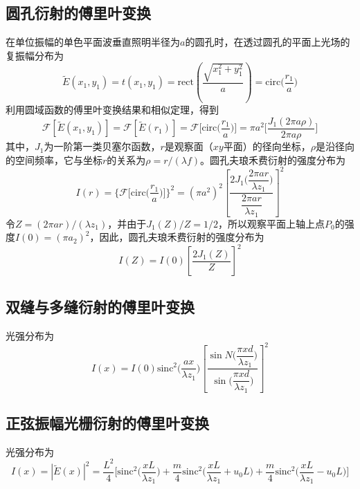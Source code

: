\documentclass[cn,10pt,chinesefont=founder,math=mtpro2,cite=super,toc=onecol,twoside]{elegantbook}
\begin{document}
\subsection{圆孔衍射的傅里叶变换}

在单位振幅的单色平面波垂直照明半径为$a$的圆孔时，在透过圆孔的平面上光场的复振幅分布为
\begin{equation}
\tilde{E}(x_1,y_1)=t(x_1,y_1)=\mathrm{rect}\left(\frac{\sqrt{x_1^2+y_1^2}}{a}\right)=\mathrm{circ}\bigg(\frac{r_1}{a}\bigg)
\end{equation}
利用圆域函数的傅里叶变换结果和相似定理，得到
\begin{equation}
\mathscr{F}[\tilde{E}(x_1,y_1)]=\mathscr{F}[\tilde{E}(r_1)]=\mathscr{F}\bigg[\mathrm{circ}\bigg(\frac{r_1}{a}\bigg)\bigg]=\pi a^2\bigg[\frac{J_1(2\pi a\rho)}{2\pi a\rho}\bigg]
\end{equation}
其中，$J_1$为一阶第一类贝塞尔函数，$r$是观察面（$xy$平面）的径向坐标，$\rho$是沿径向的空间频率，它与坐标$r$的关系为$\rho=r/(\lambda f)$。圆孔夫琅禾费衍射的强度分布为
\begin{equation}
I(r)=\bigg\{\mathscr{F}\bigg[\mathrm{circ}\bigg(\frac{r_1}{a}\bigg)\bigg]\bigg\}^2=(\pi a^2)^2\left[\frac{2J_1\bigg(\dfrac{2\pi ar}{\lambda z_1}\bigg)}{\dfrac{2\pi ar}{\lambda z_1}}\right]^2
\end{equation}
令$Z=(2\pi ar)/(\lambda z_1)$，并由于$J_1(Z)/Z=1/2$，所以观察平面上轴上点$P_0$的强度$I(0)=(\pi a_2)^2$，因此，圆孔夫琅禾费衍射的强度分布为
\begin{equation}
I(Z)=I(0)\left[\frac{2J_1(Z)}{Z}\right]^2
\end{equation}

\subsection{双缝与多缝衍射的傅里叶变换}

光强分布为
\begin{equation}
I(x)=I(0)\mathrm{sinc}^2\bigg(\frac{ax}{\lambda z_1}\bigg)\left[\frac{\sin N\bigg(\dfrac{\pi xd}{\lambda z_1}\bigg)}{\sin\bigg(\dfrac{\pi xd}{\lambda z_1}\bigg)}\right]^2
\end{equation}

\subsection{正弦振幅光栅衍射的傅里叶变换}

光强分布为
\begin{equation}
I(x)=|\tilde{E}(x)|^2=\frac{L^2}{4}\bigg[\mathrm{sinc}^2\bigg(\frac{xL}{\lambda z_1}\bigg)+\frac{m}{4}\mathrm{sinc}^2\bigg(\frac{xL}{\lambda z_1}+u_0L\bigg)+\frac{m}{4}\mathrm{sinc}^2\bigg(\frac{xL}{\lambda z_1}-u_0L\bigg)\bigg]
\end{equation}
\end{document}
